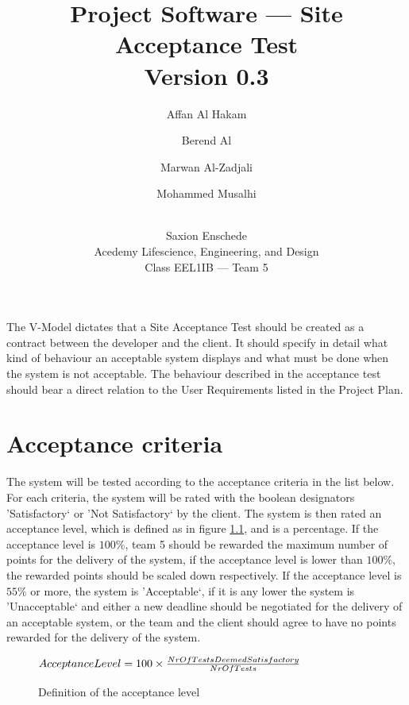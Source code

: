 \documentclass[oneside,a4paper,11pt,titlepage,openany]{report}
\author{
Affan Al Hakam \and 
Berend Al \and
Marwan Al-Zadjali \and
Mohammed Musalhi \and
\\
Saxion Enschede \\
Acedemy Lifescience, Engineering, and Design \\
Class EEL1IB --- Team 5
}
\title{Project Software --- Site Acceptance Test\\\normalsize Version 0.3}
\begin{document}
\maketitle
\tableofcontents
\listoffigures

\abstract
The V-Model\cite{vmodel} dictates that a Site Acceptance Test should be created as a contract between the developer and the client. It should specify in detail what kind of behaviour an acceptable system displays and what must be done when the system is not acceptable. The behaviour described in the acceptance test should bear a direct relation to the User Requirements listed in the Project Plan\cite{plan}.

\chapter{Acceptance criteria}
The system will be tested according to the acceptance criteria in the list below. For each criteria, the system will be rated with the boolean designators 'Satisfactory` or 'Not Satisfactory` by the client. The system is then rated an acceptance level, which is defined as in figure \ref{fig:acceptancelevel}, and is a percentage. If the acceptance level is $100\%$, team 5 should be rewarded the maximum number of points for the delivery of the system, if the acceptance level is lower than $100\%$, the rewarded points should be scaled down respectively. If the acceptance level is $55\%$ or more, the system is 'Acceptable`, if it is any lower the system is 'Unacceptable` and either a new deadline should be negotiated for the delivery of an acceptable system, or the team and the client should agree to have no points rewarded for the delivery of the system.

\begin{figure}[hp]
\centering
$AcceptanceLevel = {100 \times {NrOfTestsDeemedSatisfactory \over NrOfTests}}$
\caption{Definition of the acceptance level\label{fig:acceptancelevel}}
\end{figure}
\end{document}
